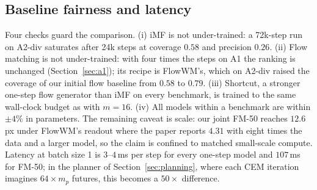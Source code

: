 \subsection{Baseline fairness and latency}
\label{sec:fairness}
Four checks guard the comparison. (i) iMF is not under-trained: a 72k-step run on A2-div saturates after 24k steps at coverage $0.58$ and precision $0.26$. (ii) Flow matching is not under-trained: with four times the steps on A1 the ranking is unchanged (Section~\ref{sec:a1}); its recipe is FlowWM's, which on A2-div raised the coverage of our initial flow baseline from $0.58$ to $0.79$. (iii) Shortcut, a stronger one-step flow generator than iMF on every benchmark, is trained to the same wall-clock budget as \imlewm{} with $m{=}16$. (iv) All models within a benchmark are within $\pm4\%$ in parameters. The remaining caveat is scale: our joint FM-50 reaches $12.6$\,px under FlowWM's readout where the paper reports $4.31$ with eight times the data and a larger model, so the claim is confined to matched small-scale compute. Latency at batch size 1 is $3$--$4$\,ms per step for every one-step model and $107$\,ms for FM-50; in the planner of Section~\ref{sec:planning}, where each CEM iteration imagines $64 \times m_p$ futures, this becomes a $50\times$ difference.
